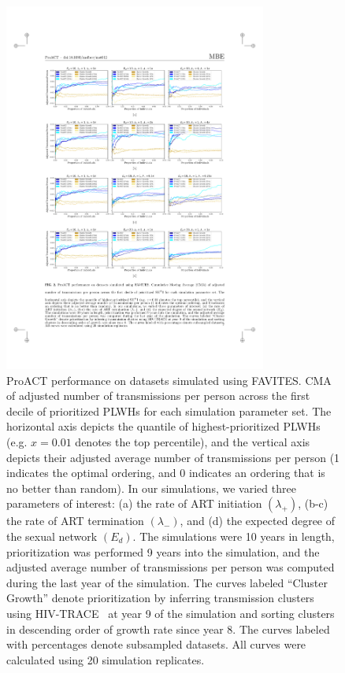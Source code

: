\begin{figure} %
\centering
\includegraphics[width=0.77\textwidth]{figs/proact-efficacy}
\caption[Adjusted ProACT Performance on Simulated Datasets]
{ProACT performance on datasets simulated using FAVITES. \gls{CMA} of adjusted number of transmissions per person across the first decile of prioritized \glspl{PLWH} for each simulation parameter set. The horizontal axis depicts the quantile of highest-prioritized \glspl{PLWH} (e.g. $x=0.01$ denotes the top percentile), and the vertical axis depicts their adjusted average number of transmissions per person (1 indicates the optimal ordering, and 0 indicates an ordering that is no better than random). In our simulations, we varied three parameters of interest: (a) the rate of \gls{ART} initiation $(\lambda_+)$, (b-c) the rate of \gls{ART} termination $(\lambda_-)$, and (d) the expected degree of the sexual network $(E_d)$. The simulations were 10 years in length, prioritization was performed 9 years into the simulation, and the adjusted average number of transmissions per person was computed during the last year of the simulation. The curves labeled ``Cluster Growth'' denote prioritization by inferring transmission clusters using HIV-TRACE~\cite{Pond2018} at year 9 of the simulation and sorting clusters in descending order of growth rate since year 8. The curves labeled with percentages denote subsampled datasets. All curves were calculated using 20 simulation replicates.}
\label{fig:proact-efficacy}
\end{figure}

